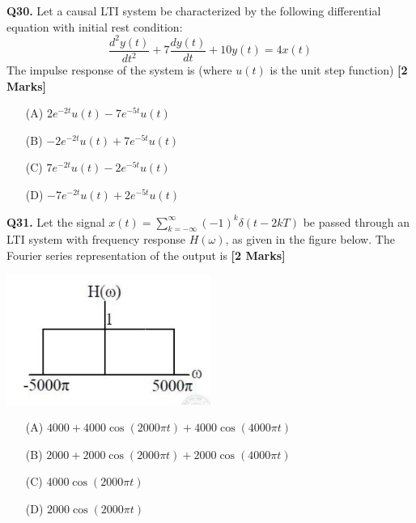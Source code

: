 \documentclass[11pt]{article}
\newcommand{\questionb}[2]{
    \noindent\textbf{Q#2.} #1 \hfill \textbf{[2 Marks]}
}
\begin{document}
\questionb{Let a causal LTI system be characterized by the following differential equation with initial rest condition: \\
\[
\frac{d^2 y(t)}{dt^2} + 7 \frac{dy(t)}{dt} + 10 y(t) = 4x(t)
\] 
The impulse response of the system is (where \( u(t) \) is the unit step function)}{30}
\begin{enumerate}
    \item[(A)] \( 2e^{-2t}u(t) - 7e^{-5t}u(t) \)  
    \item[(B)] \( -2e^{-2t}u(t) + 7e^{-5t}u(t) \)  
    \item[(C)] \( 7e^{-2t}u(t) - 2e^{-5t}u(t) \)  
    \item[(D)] \( -7e^{-2t}u(t) + 2e^{-5t}u(t) \)  
\end{enumerate}
\vspace{0.5cm}

\questionb{Let the signal \( x(t) = \sum_{k=-\infty}^{\infty} (-1)^k \delta(t - 2kT) \) be passed through an LTI system with frequency response \( H(\omega) \), as given in the figure below. The Fourier series representation of the output is}{31}
\begin{center}
\includegraphics[width=0.5\textwidth]{figures/31.png}
\end{center}
\begin{enumerate}
    \item[(A)] \( 4000 + 4000\cos(2000\pi t) + 4000\cos(4000\pi t) \)  
    \item[(B)] \( 2000 + 2000\cos(2000\pi t) + 2000\cos(4000\pi t) \)  
    \item[(C)] \( 4000\cos(2000\pi t) \)  
    \item[(D)] \( 2000\cos(2000\pi t) \)  
\end{enumerate}
\vspace{0.5cm}
\end{document}
